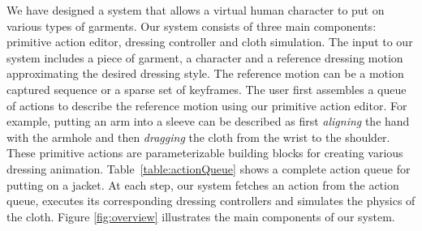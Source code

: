 We have designed a system that allows a virtual human character to put
on various types of garments. Our system consists of three main
components: primitive action editor, dressing controller and cloth
simulation. The input to our system includes a piece of garment, a
character and a reference dressing motion approximating the desired
dressing style. The reference motion can be a motion captured sequence
or a sparse set of keyframes. The user first assembles a
queue of actions to describe the reference motion using our
primitive action editor. For example, putting an arm into a sleeve can be described as first \emph{aligning} the hand with the armhole and then \emph{dragging} the cloth from the wrist to the shoulder. These primitive actions are parameterizable building blocks for creating various dressing animation. Table~\ref{table:actionQueue} shows a complete action queue for putting on a jacket. At each step, our system fetches an action from the action queue, executes its corresponding dressing controllers and simulates the physics of the cloth. Figure \ref{fig:overview} illustrates the main components of our system. 


